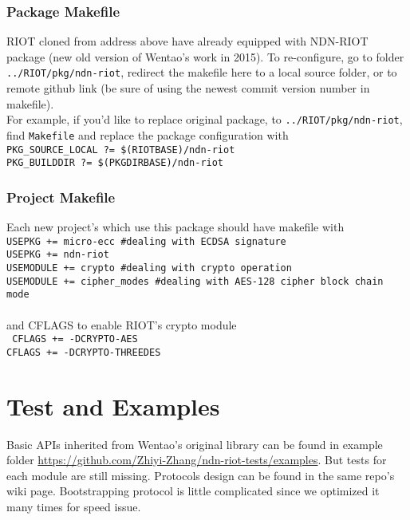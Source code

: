 \documentclass[a4paper, 11pt]{article}
\begin{document}
        \subsubsection*{Package Makefile}
        RIOT cloned from address above have already equipped with NDN-RIOT package (new old version of Wentao's work in 2015). To re-configure, go to folder \texttt{../RIOT/pkg/ndn-riot}, redirect the makefile here to a local source folder, or to remote github link (be sure of using the newest commit version number in makefile).\\
        For example, if you'd like to replace original package, to \texttt{../RIOT/pkg/ndn-riot}, find \texttt{Makefile} and replace the package configuration with \\
        \texttt{PKG\_SOURCE\_LOCAL ?= \$(RIOTBASE)/ndn-riot \\
                PKG\_BUILDDIR ?= \$(PKGDIRBASE)/ndn-riot} 
        \subsubsection*{Project Makefile}
        Each new project's which use this package should have makefile with \\
        \texttt{USEPKG += micro-ecc \hfill \#dealing with ECDSA signature\\
                USEPKG += ndn-riot  \\
                USEMODULE += crypto \hfill \#dealing with crypto operation\\
                USEMODULE += cipher\_modes \hfill \#dealing with AES-128 cipher block chain mode}\\ \\
        and CFLAGS to enable RIOT's crypto module \\
        \texttt{
                CFLAGS += -DCRYPTO-AES \\
                CFLAGS += -DCRYPTO-THREEDES} \\
    
        \section*{Test and Examples}
        Basic APIs inherited from Wentao's original library can be found in example folder \url{https://github.com/Zhiyi-Zhang/ndn-riot-tests/examples}. But tests for each module are still missing. Protocols design can be found in the same repo's wiki page. Bootstrapping protocol is little complicated since we optimized it many times for speed issue. 
 
\end{document}
